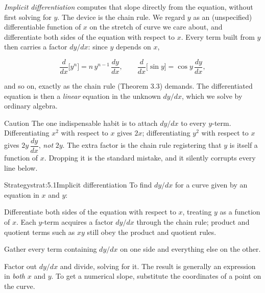 \documentclass[a4paper,12pt,oneside]{memoir}
\begin{document}
\emph{Implicit differentiation} computes that slope directly from the equation, without first solving for \(y\). The device is the chain rule. We regard \(y\) as an (unspecified) differentiable function of \(x\) on the stretch of curve we care about, and differentiate both sides of the equation with respect to \(x\). Every term built from \(y\) then carries a factor \(dy/dx\): since \(y\) depends on \(x\),

\[ \frac{d}{dx}\bigl[y^{n}\bigr] = n\,y^{n-1}\,\frac{dy}{dx}, \qquad \frac{d}{dx}\bigl[\sin y\bigr] = \cos y\,\frac{dy}{dx}, \]

and so on, exactly as the chain rule (Theorem 3.3) demands. The differentiated equation is then a \emph{linear} equation in the unknown \(dy/dx\), which we solve by ordinary algebra.

\begin{envcaution}{Caution}{}{}
The one indispensable habit is to attach \(dy/dx\) to every \(y\)-term. Differentiating \(x^{2}\) with respect to \(x\) gives \(2x\); differentiating \(y^{2}\) with respect to \(x\) gives \(2y\,\dfrac{dy}{dx}\), \emph{not} \(2y\). The extra factor is the chain rule registering that \(y\) is itself a function of \(x\). Dropping it is the standard mistake, and it silently corrupts every line below.
\end{envcaution}
\begin{envstrategy}{Strategy}{strat:5.1}{Implicit differentiation}
To find \(dy/dx\) for a curve given by an equation in \(x\) and \(y\):

\begin{steps}
  \item Differentiate both sides of the equation with respect to \(x\), treating \(y\) as a function of \(x\). Each \(y\)-term acquires a factor \(dy/dx\) through the chain rule; product and quotient terms such as \(xy\) still obey the product and quotient rules.
  \item Gather every term containing \(dy/dx\) on one side and everything else on the other.
  \item Factor out \(dy/dx\) and divide, solving for it. The result is generally an expression in \emph{both} \(x\) and \(y\). To get a numerical slope, substitute the coordinates of a point on the curve.
\end{steps}
\end{envstrategy}
\end{document}
